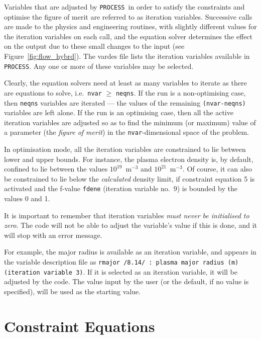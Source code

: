 \documentclass[11pt,a4paper]{report}
\newcommand{\process}{\mbox{\texttt{PROCESS}}}
\begin{document}
Variables that are adjusted by \process\ in order to satisfy the constraints and optimise the figure of merit are referred to as iteration variables. Successive
calls are made to the physics and engineering routines, with slightly
different values for the iteration variables on each call, and the equation
solver determines the effect on the output due to these small changes to the
input (see Figure~\ref{fig:flow_hybrd}). The vardes file lists the iteration variables available in \process. 
 Any one or more of these variables may be selected.

Clearly, the equation solvers need at least as many variables to iterate as
there are equations to solve, i.e.\ \texttt{nvar} $\geq$ \texttt{neqns}. If
the run is a non-optimising case, then \texttt{neqns} variables are iterated
--- the values of the remaining \texttt{(nvar-neqns)} variables are left
alone. If the run is an optimising case, then all the active iteration
variables are adjusted so as to find the minimum (or maximum) value of a
parameter (the \textit{ figure of merit}) in the \texttt{nvar}-dimensional
space of the problem.

In optimisation mode, all the iteration variables are constrained to lie
between lower and upper bounds.  For instance, the plasma electron density is,
by default, confined to lie between the values $10^{19}$~m$^{-3}$ and
$10^{21}$~m$^{-3}$. Of course, it can also be constrained to lie below the
\textit{calculated}\/ density limit, if constraint equation 5 is activated and
the f-value \texttt{fdene} (iteration variable no.\ 9) is bounded by the
values 0 and 1.

It is important to remember that iteration variables \textit{must never be
initialised to zero}. The code will not be able to adjust the variable's value
if this is done, and it will stop with an error message.

For example, the major radius is available as an iteration variable, and appears in the variable description file as \texttt{rmajor /8.14/ : plasma major radius (m) (iteration variable 3)}.
If it is selected as an iteration variable, it will be adjusted by the code.  The value input by the user (or the default, if no value is specified), will be used as the starting value.


\section{Constraint Equations}
\label{sec:constraints}
\end{document}

